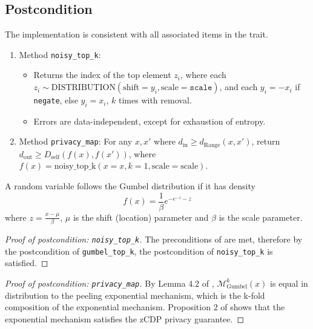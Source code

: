\documentclass{article}
\begin{document}
\subsection*{Postcondition}
\begin{theorem}
    The implementation is consistent with all associated items in the  trait.
    \begin{enumerate}
        \item Method \texttt{noisy\_top\_k}:
        \begin{itemize}
            \item Returns the index of the top element $z_i$,
            where each $z_i \sim \mathrm{DISTRIBUTION}(\mathrm{shift}=y_i, \mathrm{scale}=\texttt{scale})$,
            and each $y_i = -x_i$ if \texttt{negate}, else $y_i = x_i$,
            $k$ times with removal.
            \item Errors are data-independent, except for exhaustion of entropy.
        \end{itemize}

        \item Method \texttt{privacy\_map}:
        For any $x, x'$ where $d_\mathrm{in} \ge d_\mathrm{Range}(x, x')$,
        return $d_\mathrm{out} \ge D_\mathrm{self}(f(x), f(x'))$,
        where $f(x) = \mathrm{noisy\_top\_k}(x=x, k=1, \mathrm{scale}=\mathrm{scale})$.
    \end{enumerate}
\end{theorem}

\begin{definition}
    \label{def:Gumbel}
    A random variable follows the Gumbel distribution if it has density
    \begin{equation}
        f(x) = \frac{1}{\beta} e^{-e^{-z} - z}
    \end{equation}
    where $z = \frac{x - \mu}{\beta}$,
    $\mu$ is the shift (location) parameter and $\beta$ is the scale parameter.
\end{definition}

\begin{proof}[Proof of postcondition: \texttt{noisy\_top\_k}]
    The preconditions of  are met,
    therefore by the postcondition of \texttt{gumbel\_top\_k},
    the postcondition of \texttt{noisy\_top\_k} is satisfied.
\end{proof}

\begin{proof}[Proof of postcondition: \texttt{privacy\_map}]
    By Lemma 4.2 of \cite{Durfee2019PracticalDP}, $\mathcal{M}_{\mathrm{Gumbel}}^k(x)$ is equal in distribution to the peeling exponential mechanism,
    which is the k-fold composition of the exponential mechanism.
    Proposition 2 of \cite{Dong2019OptimalDP} shows that the exponential mechanism satisfies the zCDP privacy guarantee.
\end{proof}



\end{document}
